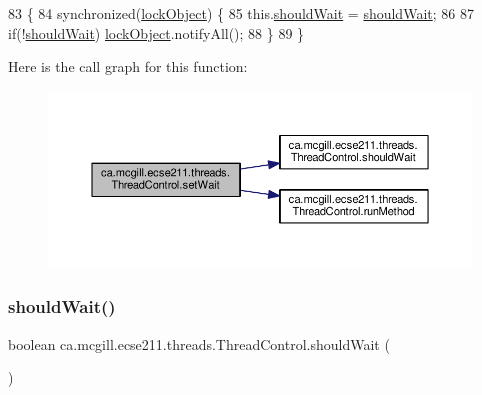 \begin{DoxyCode}
83                                           \{
84     \textcolor{keyword}{synchronized}(\hyperlink{classca_1_1mcgill_1_1ecse211_1_1threads_1_1_thread_control_ab20c44ff2dafab8981c42fa8bf634dfc}{lockObject}) \{
85       this.\hyperlink{classca_1_1mcgill_1_1ecse211_1_1threads_1_1_thread_control_a9c3896500e86e402b8019e1be6500621}{shouldWait} = \hyperlink{classca_1_1mcgill_1_1ecse211_1_1threads_1_1_thread_control_a9c3896500e86e402b8019e1be6500621}{shouldWait};
86       
87       \textcolor{keywordflow}{if}(!\hyperlink{classca_1_1mcgill_1_1ecse211_1_1threads_1_1_thread_control_a9c3896500e86e402b8019e1be6500621}{shouldWait}) \hyperlink{classca_1_1mcgill_1_1ecse211_1_1threads_1_1_thread_control_ab20c44ff2dafab8981c42fa8bf634dfc}{lockObject}.notifyAll();
88     \}
89   \}
\end{DoxyCode}
Here is the call graph for this function\+:\nopagebreak
\begin{figure}[H]
\begin{center}
\leavevmode
\includegraphics[width=350pt]{classca_1_1mcgill_1_1ecse211_1_1threads_1_1_thread_control_a7759a6f52b56e15cb37cd25ea31c93c1_cgraph}
\end{center}
\end{figure}
\mbox{\label{classca_1_1mcgill_1_1ecse211_1_1threads_1_1_thread_control_a9c3896500e86e402b8019e1be6500621}} 
\subsubsection{\texorpdfstring{should\+Wait()}{shouldWait()}}
{\footnotesize\ttfamily boolean ca.\+mcgill.\+ecse211.\+threads.\+Thread\+Control.\+should\+Wait (\begin{DoxyParamCaption}{ }\end{DoxyParamCaption})}

